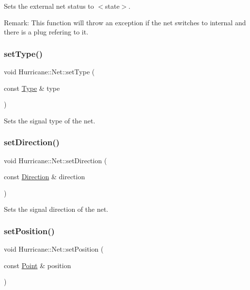Sets the external net status to {\ttfamily $<$state$>$}.

\begin{DoxyParagraph}{Remark\+: This function will throw an exception if the net switches to }
internal and there is a plug refering to it. 
\end{DoxyParagraph}
\mbox{\label{classHurricane_1_1Net_a83f5ce12291b0ec5ab584d515dd8963c}} 
\subsubsection{\texorpdfstring{set\+Type()}{setType()}}
{\footnotesize\ttfamily void Hurricane\+::\+Net\+::set\+Type (\begin{DoxyParamCaption}\item[{const \mbox{\hyperlink{classHurricane_1_1Net_1_1Type}{Type}} \&}]{type }\end{DoxyParamCaption})}

Sets the signal type of the net. \mbox{\label{classHurricane_1_1Net_ac33d13bb0ddc60f369d5bfcffc4bb0f8}} 
\subsubsection{\texorpdfstring{set\+Direction()}{setDirection()}}
{\footnotesize\ttfamily void Hurricane\+::\+Net\+::set\+Direction (\begin{DoxyParamCaption}\item[{const \mbox{\hyperlink{classHurricane_1_1Net_1_1Direction}{Direction}} \&}]{direction }\end{DoxyParamCaption})}

Sets the signal direction of the net. \mbox{\label{classHurricane_1_1Net_a0a3a3232a74ebced14b14029c5199561}} 
\subsubsection{\texorpdfstring{set\+Position()}{setPosition()}}
{\footnotesize\ttfamily void Hurricane\+::\+Net\+::set\+Position (\begin{DoxyParamCaption}\item[{const \mbox{\hyperlink{classHurricane_1_1Point}{Point}} \&}]{position }\end{DoxyParamCaption})}

